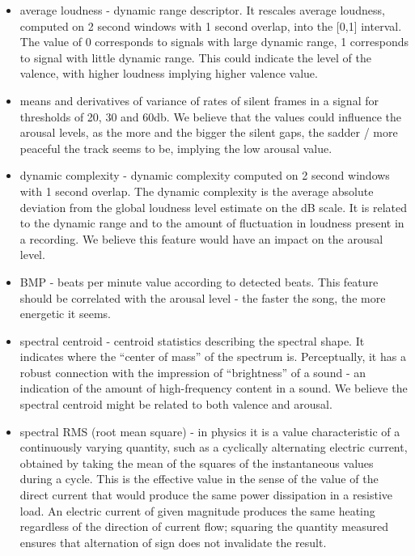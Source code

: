 \begin{itemize}

\item average loudness - dynamic range descriptor. It rescales average loudness, computed on 2 second windows with 1 second overlap, into the [0,1] interval. The value of 0 corresponds to signals with large dynamic range, 1 corresponds to signal with little dynamic range. This could indicate the level of the valence, with higher loudness implying higher valence value.

\item means and derivatives of variance of rates of silent frames in a signal for thresholds of 20, 30 and 60db. We believe that the values could influence the arousal levels, as the more and the bigger the silent gaps, the sadder / more peaceful the track seems to be, implying the low arousal value.

\item dynamic complexity - dynamic complexity computed on 2 second windows with 1 second overlap. The dynamic complexity is the average absolute deviation from the global loudness level estimate on the dB scale. It is related to the dynamic range and to the amount of fluctuation in loudness present in a recording. We believe this feature would have an impact on the arousal level.

\item BMP - beats per minute value according to detected beats. This feature should be correlated with the arousal level - the faster the song, the more energetic it seems. 

\item spectral centroid - centroid statistics describing the spectral shape. It indicates where the ``center of mass'' of the spectrum is. Perceptually, it has a robust connection with the impression of ``brightness'' of a sound - an indication of the amount of high-frequency content in a sound. We believe the spectral centroid might be related to both valence and arousal.

\item spectral RMS (root mean square) - in physics it is a value characteristic of a continuously varying quantity, such as a cyclically alternating electric current, obtained by taking the mean of the squares of the instantaneous values during a cycle. This is the effective value in the sense of the value of the direct current that would produce the same power dissipation in a resistive load. An electric current of given magnitude produces the same heating regardless of the direction of current flow; squaring the quantity measured ensures that alternation of sign does not invalidate the result.


\end{itemize}
